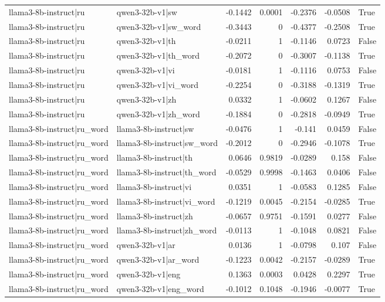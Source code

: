 \begin{table}
\begin{tabular}{l l r r r r l}
llama3-8b-instruct|ru & qwen3-32b-v1|sw & -0.1442 & 0.0001 & -0.2376 & -0.0508 & True \\
llama3-8b-instruct|ru & qwen3-32b-v1|sw_word & -0.3443 & 0 & -0.4377 & -0.2508 & True \\
llama3-8b-instruct|ru & qwen3-32b-v1|th & -0.0211 & 1 & -0.1146 & 0.0723 & False \\
llama3-8b-instruct|ru & qwen3-32b-v1|th_word & -0.2072 & 0 & -0.3007 & -0.1138 & True \\
llama3-8b-instruct|ru & qwen3-32b-v1|vi & -0.0181 & 1 & -0.1116 & 0.0753 & False \\
llama3-8b-instruct|ru & qwen3-32b-v1|vi_word & -0.2254 & 0 & -0.3188 & -0.1319 & True \\
llama3-8b-instruct|ru & qwen3-32b-v1|zh & 0.0332 & 1 & -0.0602 & 0.1267 & False \\
llama3-8b-instruct|ru & qwen3-32b-v1|zh_word & -0.1884 & 0 & -0.2818 & -0.0949 & True \\
llama3-8b-instruct|ru_word & llama3-8b-instruct|sw & -0.0476 & 1 & -0.141 & 0.0459 & False \\
llama3-8b-instruct|ru_word & llama3-8b-instruct|sw_word & -0.2012 & 0 & -0.2946 & -0.1078 & True \\
llama3-8b-instruct|ru_word & llama3-8b-instruct|th & 0.0646 & 0.9819 & -0.0289 & 0.158 & False \\
llama3-8b-instruct|ru_word & llama3-8b-instruct|th_word & -0.0529 & 0.9998 & -0.1463 & 0.0406 & False \\
llama3-8b-instruct|ru_word & llama3-8b-instruct|vi & 0.0351 & 1 & -0.0583 & 0.1285 & False \\
llama3-8b-instruct|ru_word & llama3-8b-instruct|vi_word & -0.1219 & 0.0045 & -0.2154 & -0.0285 & True \\
llama3-8b-instruct|ru_word & llama3-8b-instruct|zh & -0.0657 & 0.9751 & -0.1591 & 0.0277 & False \\
llama3-8b-instruct|ru_word & llama3-8b-instruct|zh_word & -0.0113 & 1 & -0.1048 & 0.0821 & False \\
llama3-8b-instruct|ru_word & qwen3-32b-v1|ar & 0.0136 & 1 & -0.0798 & 0.107 & False \\
llama3-8b-instruct|ru_word & qwen3-32b-v1|ar_word & -0.1223 & 0.0042 & -0.2157 & -0.0289 & True \\
llama3-8b-instruct|ru_word & qwen3-32b-v1|eng & 0.1363 & 0.0003 & 0.0428 & 0.2297 & True \\
llama3-8b-instruct|ru_word & qwen3-32b-v1|eng_word & -0.1012 & 0.1048 & -0.1946 & -0.0077 & True \\

\end{tabular}
\end{table}
